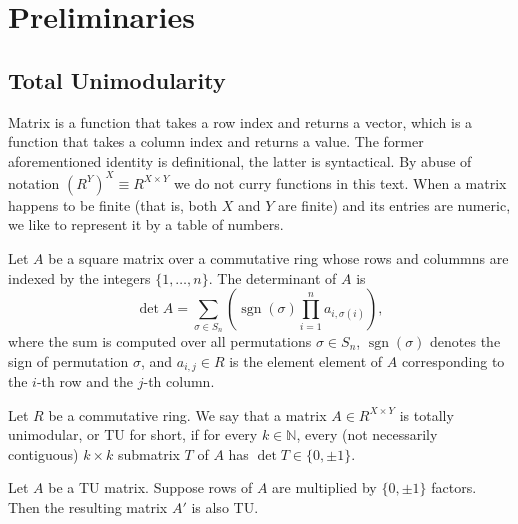 \chapter{Preliminaries}

\section{Total Unimodularity}

\begin{definition}
    \label{Matrix}
    \leanok
    Matrix is a function that takes a row index and returns a vector, which is a function that takes a column index and returns a value.
    The former aforementioned identity is definitional, the latter is syntactical.
    By abuse of notation $\left(R^Y\right)^X \equiv R^{X \times Y}$ we do not curry functions in this text.
    When a matrix happens to be finite (that is, both $X$ and $Y$ are finite) and its entries are numeric, we like to represent it by a table of numbers.
\end{definition}

\begin{definition}
    \label{Matrix.det}
    \leanok
    Let $A$ be a square matrix over a commutative ring whose rows and colummns are indexed by the integers $\{1, \dots, n\}$.
    The determinant of $A$ is
    \[
        \det A = \sum_{\sigma \in S_{n}} \left( \operatorname{sgn}(\sigma) \prod_{i = 1}^{n} a_{i, \sigma(i)} \right),
    \]
    where the sum is computed over all permutations $\sigma \in S_{n}$, $\operatorname{sgn}(\sigma)$ denotes the sign of permutation $\sigma$,
    and $a_{i,j} \in R$ is the element element of $A$ corresponding to the $i$-th row and the $j$-th column.
\end{definition}

\begin{definition}
    \label{Matrix.IsTotallyUnimodular}
    \leanok
    Let $R$ be a commutative ring. We say that a matrix $A \in R^{X \times Y}$ is totally unimodular, or TU for short, if for every $k \in \mathbb{N}$, every (not necessarily contiguous) $k \times k$ submatrix $T$ of $A$ has $\det T \in \{0, \pm 1\}$.
\end{definition}

\begin{lemma}
    \label{Matrix.IsTotallyUnimodular.mul_rows}
    \leanok
    Let $A$ be a TU matrix. Suppose rows of $A$ are multiplied by $\{0, \pm 1\}$ factors. Then the resulting matrix $A'$ is also TU.
\end{lemma}

